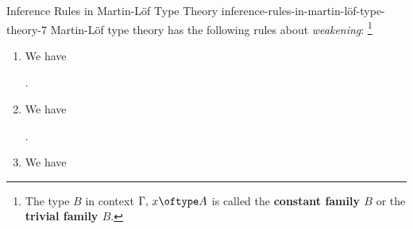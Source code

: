 \begin{definition}{Inference Rules in Martin-Löf Type Theory \rmVII}{inference-rules-in-martin-löf-type-theory-7}%
    Martin-Löf type theory has the following rules about \textit{weakening}:%
    \footnote{%
        The type $B$ in context $\Gamma,\,x\oftype A$ is called the \textbf{constant family $B$} or the \textbf{trivial family $B$}.
        \par\vspace*{\TCBBoxCorrection}
    }%
    \begin{enumerate}
        \item\label{inference-rules-in-martin-löf-type-theory-7-weakening-for-types}We have
            \begin{webprooftree}%
                \begin{prooftree}%
                \end{prooftree}%
                .%
            \end{webprooftree}%
        \item\label{inference-rules-in-martin-löf-type-theory-7-weakening-for-terms}We have
            \begin{webprooftree}%
                \begin{prooftree}%
                \end{prooftree}%
                .%
            \end{webprooftree}%
        \item\label{inference-rules-in-martin-löf-type-theory-7-weakening-for-judgemental-equality-of-types}We have
            \begin{webprooftree}%
                \begin{prooftree}%
                \end{prooftree}%

\end{webprooftree}
\end{enumerate}
\end{definition}
